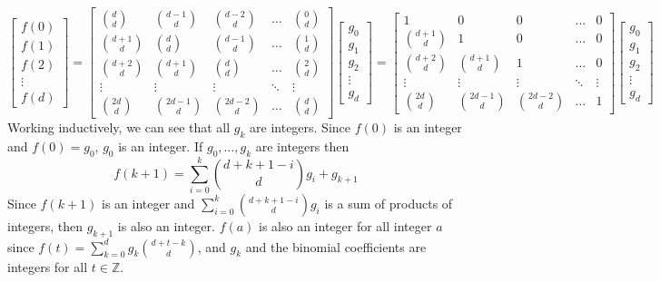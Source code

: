 \documentclass{report}
\begin{document}
   \[
      \begin{bmatrix}
         f(0) \\ f(1) \\ f(2) \\ \vdots \\ f(d)
      \end{bmatrix}
      = \begin{bmatrix}
         \binom{d}{d} & \binom{d-1}{d} & \binom{d-2}{d} &\hdots & \binom{0}{d} \\
         \binom{d+1}{d} & \binom{d}{d} & \binom{d-1}{d} &\hdots & \binom{1}{d} \\
         \binom{d+2}{d} & \binom{d+1}{d} & \binom{d}{d} &\hdots & \binom{2}{d} \\
         \vdots & \vdots & \vdots & \ddots & \vdots \\
         \binom{2d}{d} & \binom{2d-1}{d} & \binom{2d-2}{d} & \hdots & \binom{d}{d}
      \end{bmatrix}
      \begin{bmatrix}
         g_0 \\ g_1 \\ g_2 \\ \vdots \\ g_d
      \end{bmatrix}
      = \begin{bmatrix}
         1 & 0 & 0 &\hdots & 0 \\
         \binom{d+1}{d} & 1 & 0 &\hdots & 0 \\
         \binom{d+2}{d} & \binom{d+1}{d} & 1 &\hdots & 0 \\
         \vdots & \vdots & \vdots & \ddots & \vdots \\
         \binom{2d}{d} & \binom{2d-1}{d} & \binom{2d-2}{d} & \hdots & 1
      \end{bmatrix}
      \begin{bmatrix}
         g_0 \\ g_1 \\ g_2 \\ \vdots \\ g_d
      \end{bmatrix}
   \]
   Working inductively, we can see that all $g_k$ are integers.
   Since $f(0)$ is an integer and $f(0) = g_0$, $g_0$ is an integer.
   If $g_0, \hdots, g_k$ are integers then 
   \[
      f(k+1) = \sum_{i=0}^{k} \binom{d+k+1-i}{d} g_i + g_{k+1}
   \]
   Since $f(k+1)$ is an integer and $\sum_{i=0}^{k} \binom{d+k+1-i}{d} g_i$
   is a sum of products of integers, then $g_{k+1}$ is also an integer. 
   $f(a)$ is also an integer for all integer $a$ since 
   $f(t)  = \sum_{k=0}^{d} g_k\binom{d+t-k}{d}$, and
   $g_k$ and the binomial coefficients are integers for all $t \in \mathbb{Z}$.
\end{document}

